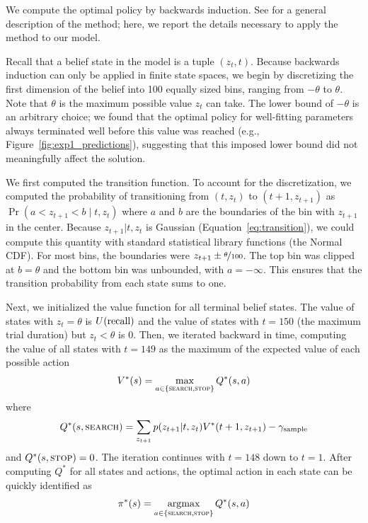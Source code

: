 We compute the optimal policy by backwards induction. See \citet{puterman2014markov} for a general description of the method; here, we report the details necessary to apply the method to our model.

Recall that a belief state in the model is a tuple $(z_t, t)$. Because backwards induction can only be applied in finite state spaces, we begin by discretizing the first dimension of the belief into 100 equally sized bins, ranging from $-\theta$ to $\theta$. Note that $\theta$ is the maximum possible value $z_t$ can take. The lower bound of $-\theta$ is an arbitrary choice; we found that the optimal policy for well-fitting parameters always terminated well before this value was reached (e.g., Figure~\ref{fig:exp1_predictions}), suggesting that this imposed lower bound did not meaningfully affect the solution.

We first computed the transition function. To account for the discretization, we computed the probability of transitioning from $(t, z_t)$ to $(t+1, z_{t+1})$ as $\Pr(a < z_{t+1} < b \mid t, z_t)$ where $a$ and $b$ are the boundaries of the bin with $z_{t+1}$ in the center. Because $z_{t+1}|t,z_t$ is Gaussian (Equation~\ref{eq:transition}), we could compute this quantity with standard statistical library functions (the Normal CDF). For most bins, the boundaries were $z_{t+1} \pm \nicefrac{\theta}{100}$. The top bin was clipped at $b = \theta$ and the bottom bin was unbounded, with $a = -\infty$. This ensures that the transition probability from each state sums to one.

Next, we initialized the value function for all terminal belief states. The value of states with $z_t = \theta$ is $U({\text{recall}})$ and the value of states with $t=150$ (the maximum trial duration) but $z_t < \theta$ is 0. Then, we iterated backward in time, computing the value of all states with $t=149$ as the maximum of the expected value of each possible action
%
\begin{equation}
\begin{aligned}
  V^*(s) = \max_{a \in \{\textsc{search}, \textsc{stop}\}} Q^*(s, a) 
\end{aligned}
\end{equation}
where
%
\begin{equation}
  Q^*(s, \textsc{search}) = \sum_{z_{t+1}} p(z_{t+1} | t, z_t) V^*(t+1, z_{t+1}) - \gamma_\text{sample}
\end{equation}
%
and $Q^*(s, \textsc{stop}) = 0$. The iteration continues with $t=148$ down to $t=1$. After computing $Q^*$ for all states and actions, the optimal action in each state can be quickly identified as
%
\begin{equation}
  \pi^*(s) = \operatorname*{argmax}_{a \in \{\textsc{search}, \textsc{stop}\}} Q^*(s, a) 
\end{equation}
%

